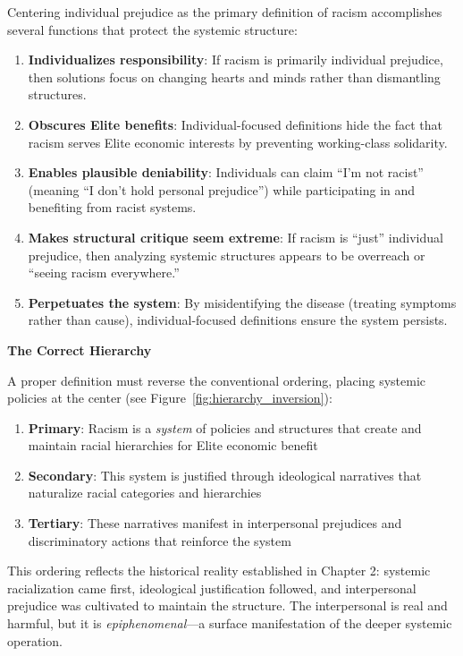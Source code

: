 \documentclass[12pt,openany]{book}
\begin{document}
Centering individual prejudice as the primary definition of racism accomplishes several functions that protect the systemic structure:

\begin{enumerate}
    \item \textbf{Individualizes responsibility}: If racism is primarily individual prejudice, then solutions focus on changing hearts and minds rather than dismantling structures.
    
    \item \textbf{Obscures Elite benefits}: Individual-focused definitions hide the fact that racism serves Elite economic interests by preventing working-class solidarity.
    
    \item \textbf{Enables plausible deniability}: Individuals can claim ``I'm not racist'' (meaning ``I don't hold personal prejudice'') while participating in and benefiting from racist systems.
    
    \item \textbf{Makes structural critique seem extreme}: If racism is ``just'' individual prejudice, then analyzing systemic structures appears to be overreach or ``seeing racism everywhere.''
    
    \item \textbf{Perpetuates the system}: By misidentifying the disease (treating symptoms rather than cause), individual-focused definitions ensure the system persists.
\end{enumerate}

\textbf{The Correct Hierarchy}

A proper definition must reverse the conventional ordering, placing systemic policies at the center (see Figure~\ref{fig:hierarchy_inversion}):

\begin{enumerate}
    \item \textbf{Primary}: Racism is a \textit{system} of policies and structures that create and maintain racial hierarchies for Elite economic benefit
    \item \textbf{Secondary}: This system is justified through ideological narratives that naturalize racial categories and hierarchies
    \item \textbf{Tertiary}: These narratives manifest in interpersonal prejudices and discriminatory actions that reinforce the system
\end{enumerate}

This ordering reflects the historical reality established in Chapter 2: systemic racialization came first, ideological justification followed, and interpersonal prejudice was cultivated to maintain the structure. The interpersonal is real and harmful, but it is \textit{epiphenomenal}---a surface manifestation of the deeper systemic operation.
\end{document}
